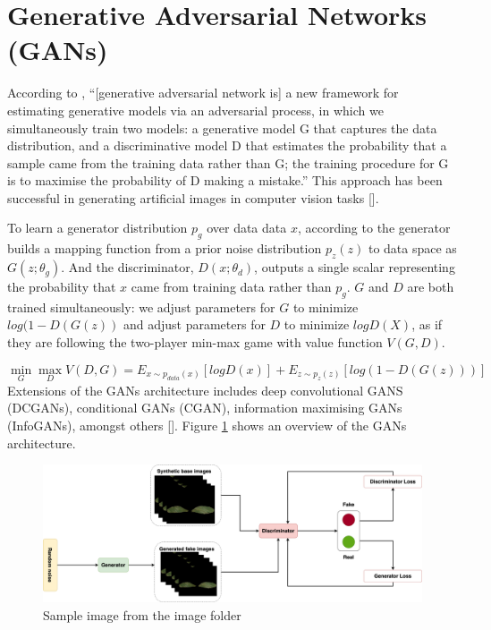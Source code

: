 \section{Generative Adversarial Networks (GANs)}
According to \cite{goodfellow2014generative}, “[generative adversarial network is] a new framework for estimating generative models via an adversarial process, in which we simultaneously train two models: a generative model G that captures the data distribution, and a discriminative model D that estimates the probability that a sample came from the training data rather than G; the training procedure for G is to maximise the probability of D making a mistake.” This approach has been successful in generating artificial images in computer vision tasks [\cite{denton2015deep}].

To learn a generator distribution $p_g$ over data data $x$, according to \cite{mirza2014conditional} the generator builds a mapping function from a prior noise distribution $p_z(z)$ to data space as $G(z; \theta_g)$. And the discriminator, $D(x; \theta_d)$, outputs a single scalar representing the probability that $x$ came from training data rather than $p_g$. $G$ and $D$ are both trained simultaneously: we adjust parameters for $G$ to minimize $log(1-D(G(z))$ and adjust parameters for $D$ to minimize $logD(X)$, as if they are following the two-player min-max game with value function $V (G, D)$.

\begin{equation} \label{gan_eqn}
\min_G \max_D V(D,G) = E_{x\sim p_{data}(x)}[logD(x)] + E_{z\sim p_z(z)}[log(1-D(G(z)))]
\end{equation}
 Extensions of the GANs architecture includes deep convolutional GANS (DCGANs), conditional GANs (CGAN), information maximising GANs (InfoGANs), amongst others [\cite{radford2015unsupervised,chen2016infogan,mirza2014conditional}]. Figure \ref{fig:my_gan} shows an overview of the GANs architecture.

\begin{figure}[!htb]
    \includegraphics[scale=0.25, keepaspectratio]{Figures/gan.png}
    \caption{Sample image from the image folder}
    \label{fig:my_gan}
\end{figure}



